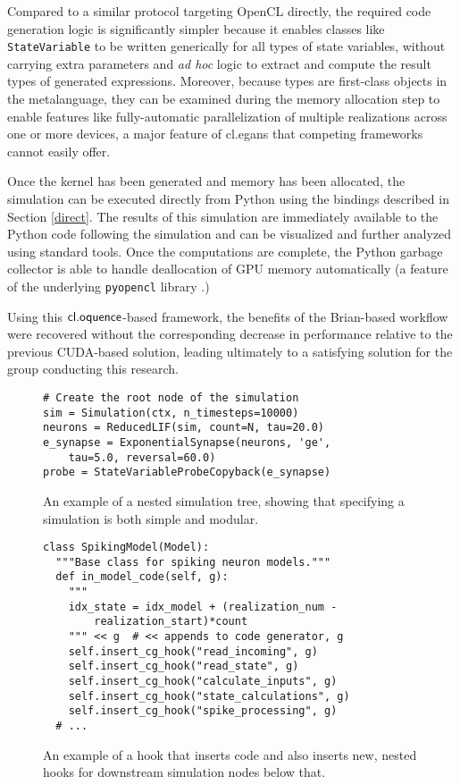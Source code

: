 \documentclass[10pt, conference, compsocconf]{IEEEtran}
\begin{document}
Compared to a similar protocol targeting OpenCL directly, the required code generation logic is significantly simpler because it enables classes like \verb|StateVariable| to be written generically for all types of state variables, without carrying extra parameters and {\it ad hoc} logic to extract and compute the result types of generated expressions. Moreover, because types are first-class objects in the metalanguage, they can be examined during the memory allocation step to enable features like fully-automatic parallelization of multiple realizations across one or more devices, a major feature of {\sf cl.egans} that competing frameworks cannot easily offer.


Once the kernel has been generated and memory has been allocated, the simulation can be executed directly from Python using the bindings described in Section \ref{direct}. The results of this simulation are immediately available to the Python code following the simulation and can be visualized and further analyzed using standard tools. Once the computations are complete, the Python garbage collector is able to handle deallocation of GPU memory automatically (a feature of the underlying \verb|pyopencl| library \cite{klockner2011pycuda}.)

Using this $\textsf{cl.oquence}$-based framework, the benefits of the Brian-based workflow were recovered without the  corresponding decrease in performance relative to the previous CUDA-based solution, leading ultimately to a satisfying solution for the group conducting this research.

\begin{figure}
\small{
\begin{verbatim}
# Create the root node of the simulation
sim = Simulation(ctx, n_timesteps=10000)
neurons = ReducedLIF(sim, count=N, tau=20.0)
e_synapse = ExponentialSynapse(neurons, 'ge',
    tau=5.0, reversal=60.0)
probe = StateVariableProbeCopyback(e_synapse)
\end{verbatim}}
\caption{An example of a nested simulation tree, showing that specifying a simulation is both simple and modular.}
\label{spec}
\end{figure}

\begin{figure}\small{
\begin{verbatim}
class SpikingModel(Model):
  """Base class for spiking neuron models."""
  def in_model_code(self, g):
    """
    idx_state = idx_model + (realization_num - 
        realization_start)*count
    """ << g  # << appends to code generator, g
    self.insert_cg_hook("read_incoming", g)
    self.insert_cg_hook("read_state", g)
    self.insert_cg_hook("calculate_inputs", g)
    self.insert_cg_hook("state_calculations", g)
    self.insert_cg_hook("spike_processing", g)
  # ...
\end{verbatim}}
\caption{An example of a hook that inserts code and also inserts new, nested hooks for downstream simulation nodes  below that.}
\label{impl}
\end{figure}
\end{document}
